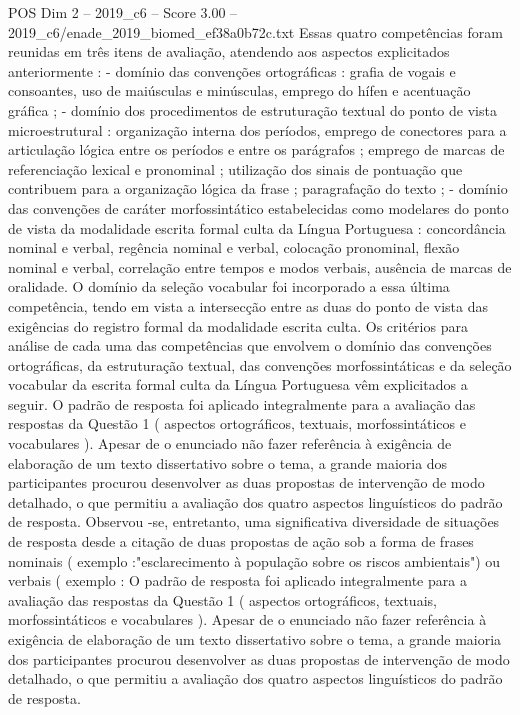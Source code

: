 \begin{textsample}{POS Dim 2 – 2019\_c6 – Score 3.00 – 2019\_c6/enade\_2019\_biomed\_ef38a0b72c.txt}
Essas quatro competências foram reunidas em três itens de avaliação, atendendo aos aspectos explicitados anteriormente : - domínio das convenções ortográficas : grafia de vogais e consoantes, uso de maiúsculas e minúsculas, emprego do hífen e acentuação gráfica ; - domínio dos procedimentos de estruturação textual do ponto de vista microestrutural : organização interna dos períodos, emprego de conectores para a articulação lógica entre os períodos e entre os parágrafos ; emprego de marcas de referenciação lexical e pronominal ; utilização dos sinais de pontuação que contribuem para a organização lógica da frase ; paragrafação do texto ; - domínio das convenções de caráter morfossintático estabelecidas como modelares do ponto de vista da modalidade escrita formal culta da Língua Portuguesa : concordância nominal e verbal, regência nominal e verbal, colocação pronominal, flexão nominal e verbal, correlação entre tempos e modos verbais, ausência de marcas de oralidade.
O domínio da seleção vocabular foi incorporado a essa última competência, tendo em vista a intersecção entre as duas do ponto de vista das exigências do registro formal da modalidade escrita culta.
Os critérios para análise de cada uma das competências que envolvem o domínio das convenções ortográficas, da estruturação textual, das convenções morfossintáticas e da seleção vocabular da escrita formal culta da Língua Portuguesa vêm explicitados a seguir.
O padrão de resposta foi aplicado integralmente para a avaliação das respostas da Questão 1 ( aspectos ortográficos, textuais, morfossintáticos e vocabulares ).
Apesar de o enunciado não fazer referência à exigência de elaboração de um texto dissertativo sobre o tema, a grande maioria dos participantes procurou desenvolver as duas propostas de intervenção de modo detalhado, o que permitiu a avaliação dos quatro aspectos linguísticos do padrão de resposta.
Observou -se, entretanto, uma significativa diversidade de situações de resposta desde a citação de duas propostas de ação sob a forma de frases nominais ( exemplo :"esclarecimento à população sobre os riscos ambientais") ou verbais ( exemplo : O padrão de resposta foi aplicado integralmente para a avaliação das respostas da Questão 1 ( aspectos ortográficos, textuais, morfossintáticos e vocabulares ).
Apesar de o enunciado não fazer referência à exigência de elaboração de um texto dissertativo sobre o tema, a grande maioria dos participantes procurou desenvolver as duas propostas de intervenção de modo detalhado, o que permitiu a avaliação dos quatro aspectos linguísticos do padrão de resposta.

\end{textsample}
